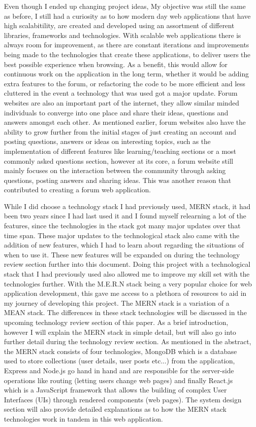 Even though I ended up changing project ideas, My objective was still the same as before, I still had a curiosity as to how modern day web applications that have high scalabitility, are created and developed using an assortment of different libraries, frameworks and technologies. With scalable web applications there is always room for improvement, as there are constant iterations and improvements being made to the technologies that create these applications, to deliver users the best possible experience when browsing. As a benefit, this would allow for continuous work on the application in the long term, whether it would be adding extra features to the forum, or refactoring the code to be more efficient and less cluttered in the event a technology that was used got a major update. Forum websites are also an important part of the internet, they allow similar minded individuals to converge into one place and share their ideas, questions and answers amongst each other. As mentioned earlier, forum websites also have the ability to grow further from the initial stages of just creating an account and posting questions, answers or ideas on interesting topics, such as the implementation of different features like learning/teaching sections or a most commonly asked questions section, however at its core, a forum website still mainly focuses on the interaction between the community through asking questions, posting answers and sharing ideas. This was another reason that contributed to creating a forum web application.

While I did choose a technology stack I had previously used, MERN stack, it had been two years since I had last used it and I found myself relearning a lot of the features, since the technologies in the stack got many major updates over that time span. These major updates to the technological stack also came with the addition of new features, which I had to learn about regarding the situations of when to use it. These new features will be expanded on during the technology review section further into this document.
Doing this project with a technological stack that I had previously used also allowed me to improve my skill set with the technologies further. With the M.E.R.N stack being a very popular choice for web application development, this gave me access to a plethora of resources to aid in my journey of developing this project. The MERN stack is a variation of a MEAN stack. The differences in these stack technologies will be discussed in the upcoming technology review section of this paper. As a brief introduction, however I will explain the MERN stack in simple detail, but will also go into further detail during the technology review section. As mentioned in the abstract, the MERN stack consists of four technologies, MongoDB which is a database used to store collections (user details, user posts etc...) from the application, Express and Node.js go hand in hand and are responsible for the server-side operations like routing (letting users change web pages) and finally React.js which is a JavaScript framework that allows the building of complex User Interfaces (UIs) through rendered components (web pages). The system design section will also provide detailed explanations as to how the MERN stack technologies work in tandem in this web application.

